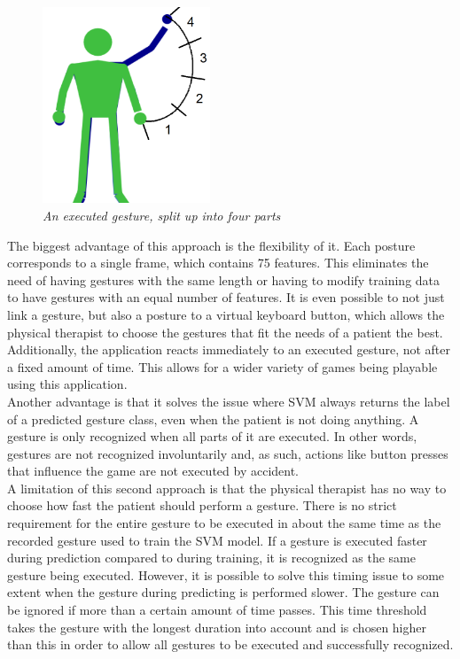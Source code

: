 \begin{figure}[H]
\begin{center}
\includegraphics[width=5cm]{SVMGesture.png}
\caption{\emph{An executed gesture, split up into four parts}}
\label{fig: gesture_split}
\end{center}
\end{figure}

The biggest advantage of this approach is the flexibility of it. Each posture corresponds to a single frame, which contains 75 features. This eliminates the need of having gestures with the same length or having to modify training data to have gestures with an equal number of features. It is even possible to not just link a gesture, but also a posture to a virtual keyboard button, which allows the physical therapist to choose the gestures that fit the needs of a patient the best. Additionally, the application reacts immediately to an executed gesture, not after a fixed amount of time. This allows for a wider variety of games being playable using this application.\\

Another advantage is that it solves the issue where SVM always returns the label of a predicted gesture class, even when the patient is not doing anything. A gesture is only recognized when all parts of it are executed. In other words, gestures are not recognized involuntarily and, as such, actions like button presses that influence the game are not executed by accident.\\

A limitation of this second approach is that the physical therapist has no way to choose how fast the patient should perform a gesture. There is no strict requirement for the entire gesture to be executed in about the same time as the recorded gesture used to train the SVM model. If a gesture is executed faster during prediction compared to during training, it is recognized as the same gesture being executed. However, it is possible to solve this timing issue to some extent when the gesture during predicting is performed slower. The gesture can be ignored if more than a certain amount of time passes. This time threshold takes the gesture with the longest duration into account and is chosen higher than this in order to allow all gestures to be executed and successfully recognized.